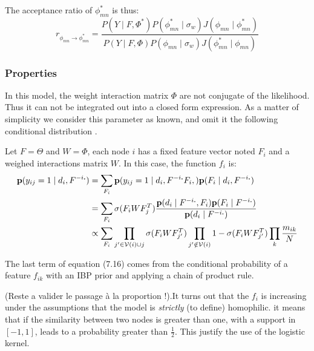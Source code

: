 \documentclass[a4paper, 12pt]{article}
\begin{document}
The acceptance ratio of $\phi_{mn}^*$ is thus:
\begin{equation} \label{eq:r_w}
r_{\phi_{mn}\rightarrow \phi_{mn}^*} = \frac{ P(Y \mid F, \Phi^*)P(\phi_{mn}^* \mid \sigma_w)J(\phi_{mn} \mid \phi_{mn}^*) }{ P(Y \mid F, \Phi)P(\phi_{mn} \mid \sigma_w)J(\phi_{mn}^* \mid \phi_{mn} )}
\end{equation}

\subsubsection{Properties}

In this model, the weight interaction matrix $\Phi$ are not conjugate of the likelihood. Thus it can not be integrated out into a closed form expression. As a matter of simplicity we consider this parameter as known, and omit it the following conditional distribution .

Let $F=\Theta$ and $W=\Phi$, each node $i$ has a fixed feature vector noted $F_i$ and a weighed interactions matrix $W$. In this case, the function $f_i$ is:
\begin{align}
\mathbf{p}(y_{ij}=1 \mid d_i, F^{-i\bm{.}}) &= \sum_{F_i} \mathbf{p}(y_{ij}=1 \mid d_i, F^{-i\bm{.}} F_i,) \mathbf{p}(F_i \mid d_i, F^{-i\bm{.}}) \\
&= \sum_{F_i} \sigma(F_iWF_j^T) \frac{\mathbf{p}(d_i \mid F^{-i\bm{.}}, F_i) \mathbf{p}(F_i\mid F^{-i\bm{.}}) }{\mathbf{p}(d_i\mid F^{-i\bm{.}})}\\
&\propto \sum_{F_i} \prod_{j' \in \mathcal{V}(i) \cup {j}} \sigma(F_iWF_{j'}^T)\prod_{j' \notin \mathcal{V}(i)} 1-\sigma(F_iWF_{j'}^T) \prod_k \frac{m_{ik}}{N}
\end{align}

The last term of equation (7.16) comes from the conditional probability of a feature $f_{ik}$ with an IBP prior and applying a chain of product rule. 

(Reste a valider le passage à la proportion !).It turns out that the $f_i$ is increasing under the assumptions that the model is \emph{strictly} (to define) homophilic. it means that if the similarity between two nodes is greater than one, with a support in $[-1, 1]$, leads to a probability greater than $\frac{1}{2}$. This justify the use of the logistic kernel. 

\end{document}
